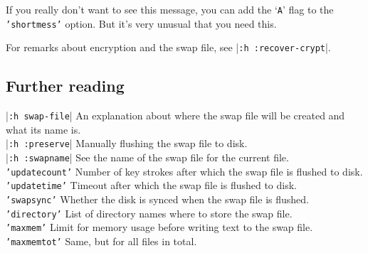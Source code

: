 If you really don't want to see this message, you can add the `\texttt{A}' flag to the \texttt{'shortmess'} option.
But it's very unusual that you need this.

For remarks about encryption and the swap file, see |\texttt{:h :recover-crypt}|.

\subsection{Further reading}
|\texttt{:h swap-file}|    An explanation about where the swap file will be created and what its name is. \\
|\texttt{:h :preserve}|    Manually flushing the swap file to disk. \\
|\texttt{:h :swapname}|    See the name of the swap file for the current file. \\
\texttt{'updatecount'}  Number of key strokes after which the swap file is flushed to disk. \\
\texttt{'updatetime'}    Timeout after which the swap file is flushed to disk. \\
\texttt{'swapsync'}    Whether the disk is synced when the swap file is flushed. \\
\texttt{'directory'}  List of directory names where to store the swap file. \\
\texttt{'maxmem'}    Limit for memory usage before writing text to the swap file. \\
\texttt{'maxmemtot'}  Same, but for all files in total. \\
\clearpage
